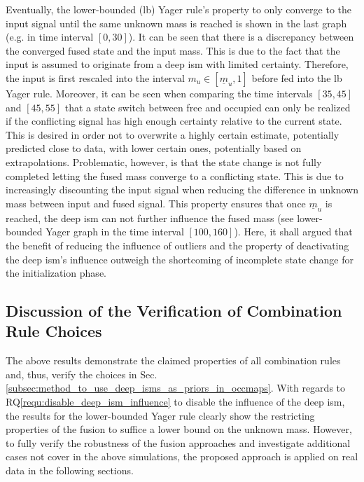 Eventually, the lower-bounded (lb) Yager rule's property to only converge to the input signal until the same unknown mass is reached is shown in the last graph (e.g. in time interval $[0, 30]$). It can be seen that there is a discrepancy between the converged fused state and the input mass. This is due to the fact that the input is assumed to originate from a deep \gls{ism} with limited certainty. Therefore, the input is first rescaled into the interval $m_u \in [\underline{m}_u, 1]$ before fed into the lb Yager rule. Moreover, it can be seen when comparing the time intervals $[35, 45]$ and $[45, 55]$ that a state switch between free and occupied can only be realized if the conflicting signal has high enough certainty relative to the current state. This is desired in order not to overwrite a highly certain estimate, potentially predicted close to data, with lower certain ones, potentially based on extrapolations. Problematic, however, is that the state change is not fully completed letting the fused mass converge to a conflicting state. This is due to increasingly discounting the input signal when reducing the difference in unknown mass between input and fused signal. This property ensures that once $\underline{m}_u$ is reached, the deep \gls{ism} can not further influence the fused mass (see lower-bounded Yager graph in the time interval $[100, 160]$). Here, it shall argued that the benefit of reducing the influence of outliers and the property of deactivating the deep \gls{ism}'s influence outweigh the shortcoming of incomplete state change for the initialization phase. 
%
\subsection{Discussion of the Verification of Combination Rule Choices}
\label{subsec:discussion_choice_comb_rule}
The above results demonstrate the claimed properties of all combination rules and, thus, verify the choices in Sec. \ref{subsec:method_to_use_deep_isms_as_priors_in_occmaps}. With regards to RQ\ref{requ:disable_deep_ism_influence} to disable the influence of the deep \gls{ism}, the results for the lower-bounded Yager rule clearly show the restricting properties of the fusion to suffice a lower bound on the unknown mass. However, to fully verify the robustness of the fusion approaches and investigate additional cases not cover in the above simulations, the proposed approach is applied on real data in the following sections.
%
